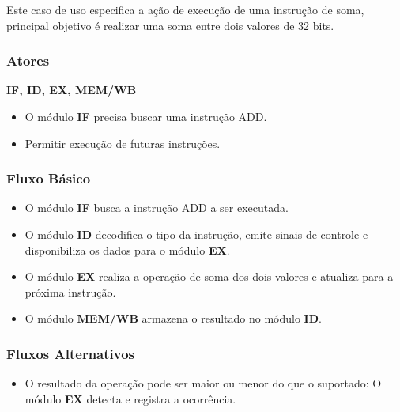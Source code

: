 
Este caso de uso especifica a ação de execução de uma instrução de soma, principal objetivo é realizar uma soma entre dois valores de 32 bits.
 
\subsubsection*{Atores}
\textbf{IF, ID, EX, MEM/WB}

\preconditions 
\begin{itemize}
 \item O módulo \textbf{IF} precisa buscar uma instrução ADD.
\end{itemize}

\postconditions
\begin{itemize}
  \item Permitir execução de futuras instruções.
\end{itemize}

\subsubsection*{Fluxo Básico}
\begin{itemize}
\item O módulo \textbf{IF} busca a instrução ADD a ser executada.
\item O módulo \textbf{ID} decodifica o tipo da instrução, emite sinais de controle e disponibiliza os dados para o módulo \textbf{EX}.
\item O módulo \textbf{EX} realiza a operação de soma dos dois valores e atualiza para a próxima instrução.
\item O módulo \textbf{MEM/WB} armazena o resultado no módulo \textbf{ID}.
\end{itemize}

\subsubsection*{Fluxos Alternativos}
\begin{itemize}
\item O resultado da operação pode ser maior ou menor do que o suportado:
\subitem O módulo \textbf{EX} detecta e registra a ocorrência.
\end{itemize}

%		

